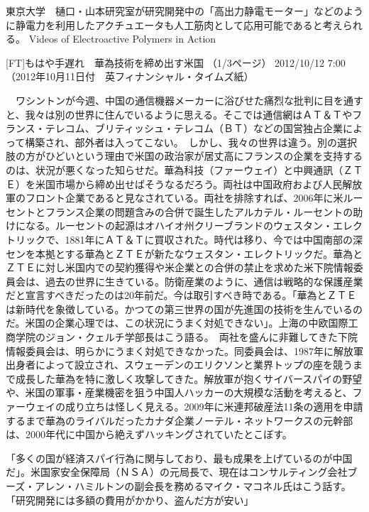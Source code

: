 東京大学　樋口・山本研究室が研究開発中の「高出力静電モーター」などのように静電力を利用したアクチュエータも人工筋肉として応用可能であると考えられる。 Videos of Electroactive Polymers in Action



[FT]もはや手遅れ　華為技術を締め出す米国
（1/3ページ） 2012/10/12 7:00
（2012年10月11日付　英フィナンシャル・タイムズ紙）

　ワシントンが今週、中国の通信機器メーカーに浴びせた痛烈な批判に目を通すと、我々は別の世界に住んでいるように思える。そこでは通信網はＡＴ＆Ｔやフランス・テレコム、ブリティッシュ・テレコム（ＢＴ）などの国営独占企業によって構築され、部外者は入ってこない。　しかし、我々の世界は違う。別の選択肢の方がひどいという理由で米国の政治家が居丈高にフランスの企業を支持するのは、状況が悪くなった知らせだ。華為科技（ファーウェイ）と中興通訊（ＺＴＥ）を米国市場から締め出せばそうなるだろう。両社は中国政府および人民解放軍のフロント企業であると見なされている。両社を排除すれば、2006年に米ルーセントとフランス企業の問題含みの合併で誕生したアルカテル・ルーセントの助けになる。ルーセントの起源はオハイオ州クリーブランドのウェスタン・エレクトリックで、1881年にＡＴ＆Ｔに買収された。時代は移り、今では中国南部の深センを本拠とする華為とＺＴＥが新たなウェスタン・エレクトリックだ。華為とＺＴＥに対し米国内での契約獲得や米企業との合併の禁止を求めた米下院情報委員会は、過去の世界に生きている。防衛産業のように、通信は戦略的な保護産業だと宣言すべきだったのは20年前だ。今は取引すべき時である。「華為とＺＴＥは新時代を象徴している。かつての第三世界の国が先進国の技術を生んでいるのだ。米国の企業心理では、この状況にうまく対処できない」。上海の中欧国際工商学院のジョン・クェルチ学部長はこう語る。　両社を盛んに非難してきた下院情報委員会は、明らかにうまく対処できなかった。同委員会は、1987年に解放軍出身者によって設立され、スウェーデンのエリクソンと業界トップの座を競うまで成長した華為を特に激しく攻撃してきた。解放軍が抱くサイバースパイの野望や、米国の軍事・産業機密を狙う中国人ハッカーの大規模な活動を考えると、ファーウェイの成り立ちは怪しく見える。2009年に米連邦破産法11条の適用を申請するまで華為のライバルだったカナダ企業ノーテル・ネットワークスの元幹部は、2000年代に中国から絶えずハッキングされていたとこぼす。

「多くの国が経済スパイ行為に関与しており、最も成果を上げているのが中国だ」。米国家安全保障局（ＮＳＡ）の元局長で、現在はコンサルティング会社ブーズ・アレン・ハミルトンの副会長を務めるマイク・マコネル氏はこう話す。「研究開発には多額の費用がかかり、盗んだ方が安い」

